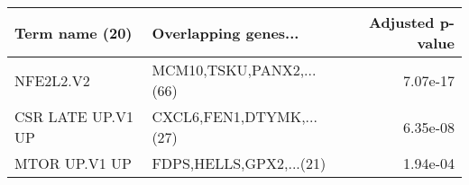 \begin{tabular}{llr}
\toprule
   Term name (20) &     Overlapping genes... &  Adjusted p-value \\
\midrule
        NFE2L2.V2 & MCM10,TSKU,PANX2,...(66) &          7.07e-17 \\
CSR LATE UP.V1 UP & CXCL6,FEN1,DTYMK,...(27) &          6.35e-08 \\
    MTOR UP.V1 UP &  FDPS,HELLS,GPX2,...(21) &          1.94e-04 \\
\bottomrule
\end{tabular}
